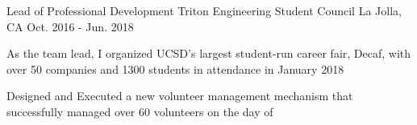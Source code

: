 

\begin{cventries}

  \cventry
    {Lead of Professional Development} %
    {Triton Engineering Student Council} %
    {La Jolla, CA} %
    {Oct. 2016 - Jun. 2018} %
    {
      \begin{cvitems} %
        \item {As the team lead, I organized UCSD's largest student-run career fair, Decaf, with over 50 companies and 1300 students in attendance in January 2018}
% 
% 
% 
% 
        \item {Designed and Executed a new volunteer management mechanism that successfully managed over 60 volunteers on the day of}
% 
% 
      \end{cvitems}
    }


\end{cventries}
